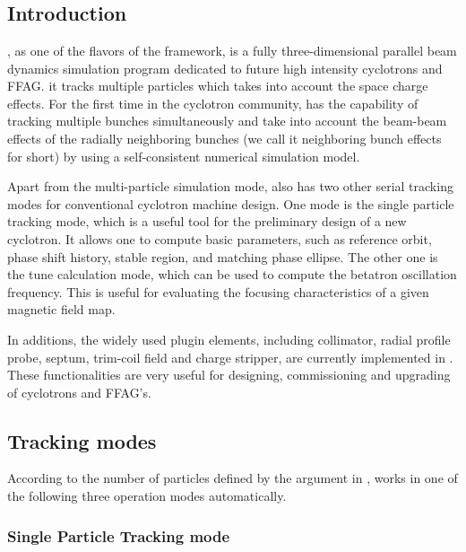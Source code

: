 

\chapter{\opalcycl}
\label{chp:opalcycl}


\section{Introduction}

\opalcycl, as one of the flavors of the \opal framework,  is a fully three-dimensional parallel beam dynamics simulation program dedicated to future high intensity cyclotrons and FFAG. it tracks multiple particles  which takes into account the space charge effects. For the first time in the cyclotron community, \opalcycl has the capability of tracking multiple bunches simultaneously
and take into account the beam-beam effects of the radially neighboring bunches (we call it neighboring bunch effects for short)
by using a self-consistent numerical simulation model.

Apart from the multi-particle simulation mode, \opalcycl also has two other serial tracking modes for conventional cyclotron machine design. One mode is the single particle tracking mode, which is a useful tool for the preliminary design of a new cyclotron.  It allows one to compute basic parameters, such as reference orbit, phase shift history, stable region, and matching phase ellipse. The other one is the tune calculation mode, which can be used to compute the betatron oscillation frequency.
This is useful for evaluating the focusing characteristics of a given magnetic field map.

In additions, the widely used plugin elements, including collimator,  radial profile probe, septum, trim-coil field and charge stripper,  are currently implemented in \opalcycl.  These functionalities are very useful for designing, commissioning and upgrading of cyclotrons and FFAG's.

\section{Tracking modes}
According to the number of particles defined by the argument  in   ,
\opalcycl  works in one of the following three operation modes automatically.


\subsection{Single Particle Tracking mode}

